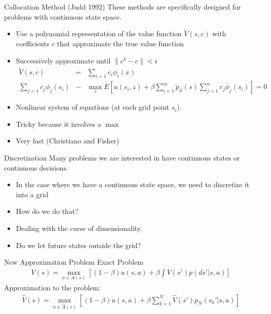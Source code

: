 \documentclass[aspectratio=169,11pt]{beamer}
\begin{document}
\begin{frame}{Collocation Method (Judd 1992)}
These methods are specifically designed for problems with continuous state space.
\begin{itemize}
\item Use a polynomial representation of the value function $\tilde{V}(s,c)$ with coefficients $c$ that approximate the true value function
\item Successively approximate until $\| c^k - c \| < \epsilon$
\begin{eqnarray*}
\tilde{V}(s,c) &=& \sum_{i=1}c_i \phi_i(x)\\
 \sum_{j=1} c_j \phi_j (s_i) &-& \max_z E \left[ u(s_i,z) + \beta \sum_{i=1}^m \tilde p_{il} (s) \sum_{j=1}^n c_j \phi_j (s_i) \right] = 0
\end{eqnarray*}
\item Nonlinear system of equations (at each grid point $s_i$).
\item Tricky because it involves a $\max$
\item Very fast (Christiano and Fisher)
\end{itemize}
\end{frame}

\begin{frame}{Discretization}
Many problems we are interested in have continuous states or continuous decisions.
\begin{itemize}
\item In the case where we have a continuous state space, we need to discretize it into a grid
\item How do we do that?
\item Dealing with the curse of dimensionality.
\item Do we let future states outside the grid?
\end{itemize}
\end{frame}

\begin{frame}{New Approximation Problem}
Exact Problem
\begin{eqnarray*}
V(s) = \max_{a \in A(s)} \left[ (1-\beta) u(s,a) + \beta \int V(s')p(ds' | s,a) \right]
\end{eqnarray*}
Approximation to the problem:
\begin{eqnarray*}
\hat{V}(s) = \max_{a \in \hat{A}(s)} \left[ (1-\beta) u(s,a) + \beta \sum_{k=1}^N \hat{V}(s')p_N (s_k' | s,a) \right]
\end{eqnarray*}
\end{frame}
\end{document}
